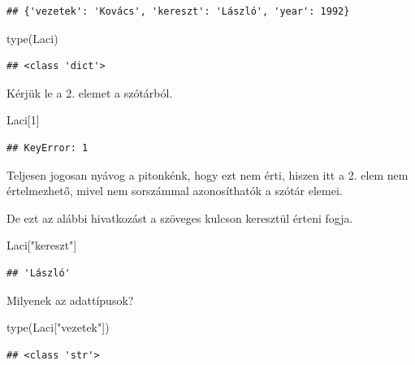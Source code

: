 \documentclass[
]{book}
\newenvironment{Shaded}{\begin{snugshade}}{\end{snugshade}}
\newcommand{\BuiltInTok}[1]{#1}
\newcommand{\DecValTok}[1]{\textcolor[rgb]{0.00,0.00,0.81}{#1}}
\newcommand{\NormalTok}[1]{#1}
\newcommand{\StringTok}[1]{\textcolor[rgb]{0.31,0.60,0.02}{#1}}
\begin{document}
\begin{verbatim}
## {'vezetek': 'Kovács', 'kereszt': 'László', 'year': 1992}
\end{verbatim}

\begin{Shaded}
\begin{Highlighting}[]
\BuiltInTok{type}\NormalTok{(Laci)}
\end{Highlighting}
\end{Shaded}

\begin{verbatim}
## <class 'dict'>
\end{verbatim}

Kérjük le a 2. elemet a szótárból.

\begin{Shaded}
\begin{Highlighting}[]
\NormalTok{Laci[}\DecValTok{1}\NormalTok{]}
\end{Highlighting}
\end{Shaded}

\begin{verbatim}
## KeyError: 1
\end{verbatim}

Teljesen jogosan nyávog a pitonkénk, hogy ezt nem érti, hiszen itt a 2. elem nem értelmezhető, mivel nem sorszámmal azonosíthatók a szótár elemei.

De ezt az alábbi hivatkozást a szöveges kulcson keresztül érteni fogja.

\begin{Shaded}
\begin{Highlighting}[]
\NormalTok{Laci[}\StringTok{"kereszt"}\NormalTok{]}
\end{Highlighting}
\end{Shaded}

\begin{verbatim}
## 'László'
\end{verbatim}

Milyenek az adattípusok?

\begin{Shaded}
\begin{Highlighting}[]
\BuiltInTok{type}\NormalTok{(Laci[}\StringTok{"vezetek"}\NormalTok{])}
\end{Highlighting}
\end{Shaded}

\begin{verbatim}
## <class 'str'>
\end{verbatim}
\end{document}
